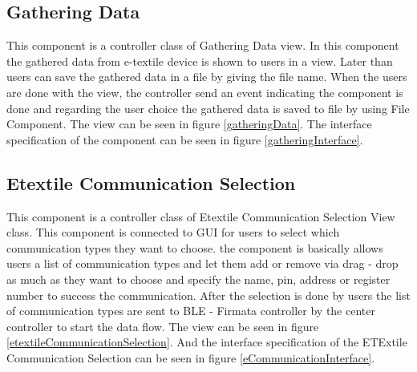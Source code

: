 
\subsection{Gathering Data}
This component is a controller class of Gathering Data view. In this component the gathered data from e-textile device is shown to users in a view. Later than users can save the gathered data in a file by giving the file name. When the users are done with the view, the controller send an event indicating the component is done and regarding the user choice the gathered data is saved to file by using File Component. The view can be seen in figure \ref{gatheringData}. The interface specification of the component can be seen in figure \ref{gatheringInterface}.



\subsection{Etextile Communication Selection}
This component is a controller class of Etextile Communication Selection View class. This component is connected to GUI for users to select which communication types they want to choose. the component is basically allows users a list of communication types and let them add or remove via drag - drop as much as they want to choose and specify the name, pin, address or register number to success the communication. After the selection is done by users the list of communication types are sent to BLE - Firmata controller by the center controller to start the data flow. The view can be seen in figure \ref{etextileCommunicationSelection}. And the interface specification of the ETExtile Communication Selection can be seen in figure \ref{eCommunicationInterface}.




